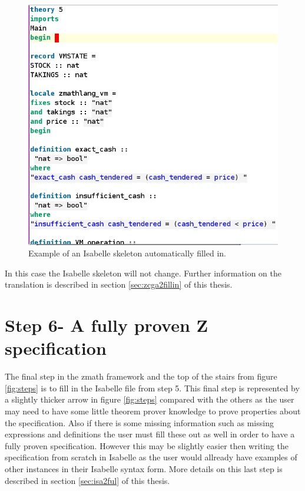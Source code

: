 \begin{figure}[H]
 \begin{center}
 \includegraphics [scale=0.3]{Figures/Design/fillin1.png}
 \caption{Example of an Isabelle skeleton automatically filled in.}
 \label{fig:fillin1}
\end{center}
\end{figure} 

 In this case the Isabelle skeleton will not change. Further information on the translation is described in section \ref{sec:zcga2fillin} of this thesis.

\section{Step 6- A fully proven Z specification}

The final step in the \gls{zmath} framework and the top of the stairs from figure \ref{fig:steps} is to fill in the Isabelle file from step 5. This final step is represented by a slightly thicker arrow in figure \ref{fig:steps} compared with the others as the user may need to have some little theorem prover knowledge to prove properties about the specification. Also if there is some missing information such as missing expressions and definitions the user must fill these out as well in order to have a fully proven specification. However this may be slightly easier then writing the specification from scratch in Isabelle as the user would allready have examples of other instances in their Isabelle syntax form. More details on this last step is described in section \ref{sec:isa2ful} of this thesis.

